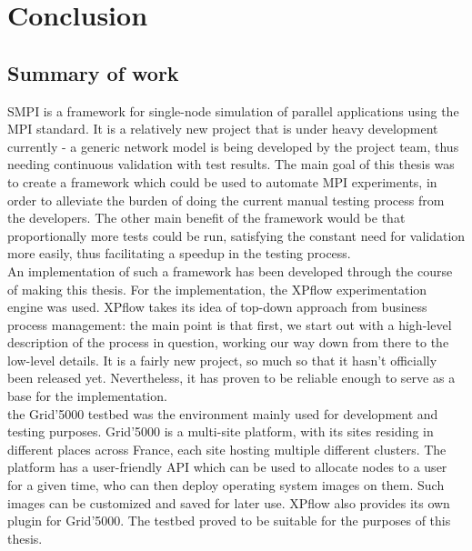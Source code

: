 




\chapter{Conclusion}
\label{Chapter6}

\section{Summary of work}
SMPI is a framework for single-node simulation of parallel
applications using the MPI standard. It is a relatively new project
that is under heavy
development currently - a generic network model is being developed by
the project team, thus needing continuous validation with test
results. The main goal of this thesis was to create a framework which
could be used to automate MPI experiments, in order to alleviate the
burden of doing the current manual testing process from the
developers. The other main benefit of the framework would be that
proportionally more tests could be run, satisfying the constant need
for validation more easily, thus facilitating a speedup in the testing
process.\\[0.3cm]
An implementation of such a framework has been developed through the
course of making this thesis. For the implementation, the XPflow
experimentation engine was used. XPflow takes its idea of top-down
approach from business process management: the main point is that
first, we start out with a high-level description of the process in
question, working our way down from there to the low-level details. It
is a fairly new
project, so much so that it hasn't officially been released
yet. Nevertheless, it has proven to be reliable enough to serve as a
base for the implementation.\\[0.3cm]
the Grid'5000 testbed was the environment mainly used for
development and testing purposes. Grid'5000 is a multi-site platform,
with its sites residing in different places across France, each site
hosting multiple different clusters. The platform has a user-friendly
API which can be used to allocate nodes to a user for a given time,
who can then deploy operating system images on them. Such images
can be customized and saved for later use. XPflow also provides its
own plugin for Grid'5000. The testbed proved to be suitable for the
purposes of this thesis.\\[0.3cm]
